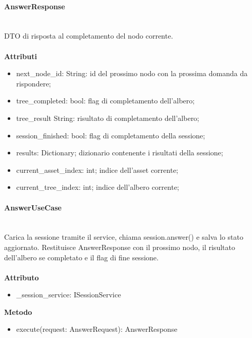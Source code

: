 \documentclass[a4paper,12pt]{article}
\begin{document}
                \paragraph{AnswerResponse}\mbox{}\\
                    DTO di risposta al completamento del nodo corrente.\\\\
                    \textbf{Attributi}
                    \begin{itemize}
                        \item {\ttfamily next\_node\_id: String}: id del prossimo nodo con la prossima domanda da rispondere;
                        \item {\ttfamily tree\_completed: bool}: flag di completamento dell'albero;
                        \item {\ttfamily tree\_result String}: risultato di completamento dell'albero;
                        \item {\ttfamily session\_finished: bool}: flag di completamento della sessione;
                        \item {\ttfamily results: Dictionary}; dizionario contenente i risultati della sessione;
                        \item {\ttfamily current\_asset\_index: int}; indice dell'asset corrente;
                        \item {\ttfamily current\_tree\_index: int}; indice dell'albero corrente;
                    \end{itemize}

                \paragraph{AnswerUseCase}\mbox{}\\
                    Carica la sessione tramite il service, chiama {\ttfamily session.answer()} e salva lo stato aggiornato. Restituisce {\ttfamily AnswerResponse} con il prossimo nodo, il risultato dell'albero se completato e il flag di fine sessione.\\\\
                    \textbf{Attributo}
                    \begin{itemize}
                        \item {\ttfamily \_session\_service: ISessionService}
                    \end{itemize}
                    \textbf{Metodo}
                    \begin{itemize}
                        \item {\ttfamily execute(request: AnswerRequest): AnswerResponse}
                    \end{itemize}
\end{document}

